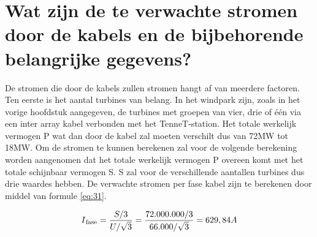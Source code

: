 \section{Wat zijn de te verwachte stromen door de kabels en de bijbehorende belangrijke gegevens?}

De stromen die door de kabels zullen stromen hangt af van meerdere factoren. Ten eerste is het aantal turbines van belang. In het windpark zijn, zoals in het vorige hoofdstuk aangegeven, de turbines met groepen van vier, drie of één via een inter array kabel verbonden met het TenneT-station. Het totale werkelijk vermogen P wat dan door de kabel zal moeten verschilt dus van 72MW tot 18MW. Om de stromen te kunnen berekenen zal voor de volgende berekening worden aangenomen dat het totale werkelijk vermogen P overeen komt met het totale schijnbaar vermogen S. S zal voor de verschillende aantallen turbines dus drie waardes hebben. 
De verwachte stromen per fase kabel zijn te berekenen door middel van formule \ref{eq:31}. 

\begin{equation} \label{eq:31}
I\textsubscript{fase} = \frac{S/3}{U/ \sqrt{3}} = \frac{72.000.000/3}{66.000/ \sqrt{3}} = 629,84 A
\end{equation}


